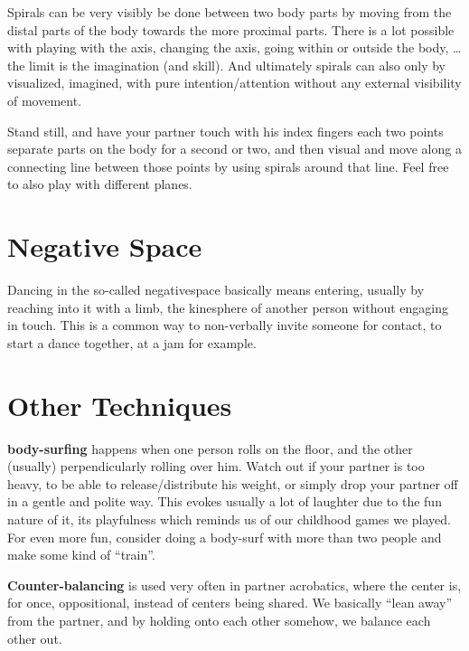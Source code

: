 Spirals can be very visibly be done between two body parts by moving from the distal parts of the body towards the more proximal parts.
There is a lot possible with playing with the axis, changing the axis, going within or outside the body, \ldots the limit is the imagination (and skill).
And ultimately spirals can also only by visualized, imagined, with pure intention/attention without any external visibility of movement.

\begin{exercise}
    Stand still, and have your partner touch with his index fingers each two points separate parts on the body for a second or two, and then visual and move along a connecting line between those points by using spirals around that line.
    Feel free to also play with different planes.
\end{exercise}

\section{Negative Space}\label{sec:negative-space}

Dancing in the so-called \gls{negativespace} basically means entering, usually by reaching into it with a limb, the \gls{kinesphere} of another person without engaging in touch.
This is a common way to non-verbally invite someone for contact, to start a dance together, at a jam for example.

\section{Other Techniques}\label{sec:other-techniques}

\textbf{\Gls{body-surfing}} happens when one person rolls on the floor, and the other (usually) perpendicularly rolling over him.
Watch out if your partner is too heavy, to be able to release/distribute his weight, or simply drop your partner off in a gentle and polite way.
This evokes usually a lot of laughter due to the fun nature of it, its playfulness which reminds us of our childhood games we played.
For even more fun, consider doing a body-surf with more than two people and make some kind of ``train''.

\textbf{Counter-balancing} is used very often in partner acrobatics, where the center is, for once, oppositional, instead of centers being shared.
We basically ``lean away'' from the partner, and by holding onto each other somehow, we balance each other out.
